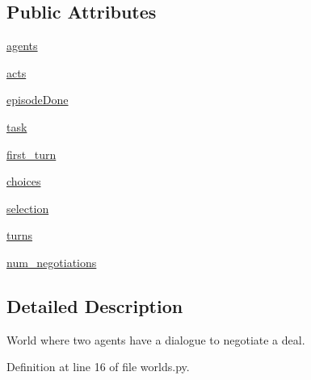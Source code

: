 \subsection*{Public Attributes}
\begin{DoxyCompactItemize}
\item 
\hyperlink{classparlai_1_1mturk_1_1tasks_1_1dealnodeal_1_1worlds_1_1MTurkDealNoDealDialogWorld_acc5597cd05b87753c3469fb199d606a2}{agents}
\item 
\hyperlink{classparlai_1_1mturk_1_1tasks_1_1dealnodeal_1_1worlds_1_1MTurkDealNoDealDialogWorld_a13200c06840e4af9142e7ae618d8aadb}{acts}
\item 
\hyperlink{classparlai_1_1mturk_1_1tasks_1_1dealnodeal_1_1worlds_1_1MTurkDealNoDealDialogWorld_ab9db614ebf4ef49ae3cb5c9d457dd94a}{episode\+Done}
\item 
\hyperlink{classparlai_1_1mturk_1_1tasks_1_1dealnodeal_1_1worlds_1_1MTurkDealNoDealDialogWorld_a56304056eb502fc650006f813463be53}{task}
\item 
\hyperlink{classparlai_1_1mturk_1_1tasks_1_1dealnodeal_1_1worlds_1_1MTurkDealNoDealDialogWorld_a2f5c4c36ef750abcc732aa69ecb40aed}{first\+\_\+turn}
\item 
\hyperlink{classparlai_1_1mturk_1_1tasks_1_1dealnodeal_1_1worlds_1_1MTurkDealNoDealDialogWorld_a8443d7268281402cc47e55bbb0e64852}{choices}
\item 
\hyperlink{classparlai_1_1mturk_1_1tasks_1_1dealnodeal_1_1worlds_1_1MTurkDealNoDealDialogWorld_aade83c7381db07e26f51d6a94479546d}{selection}
\item 
\hyperlink{classparlai_1_1mturk_1_1tasks_1_1dealnodeal_1_1worlds_1_1MTurkDealNoDealDialogWorld_aa0ef48dc444aa808a5aae96dfb750771}{turns}
\item 
\hyperlink{classparlai_1_1mturk_1_1tasks_1_1dealnodeal_1_1worlds_1_1MTurkDealNoDealDialogWorld_a89577b0e6dc72509d7ce67f899d48d75}{num\+\_\+negotiations}
\end{DoxyCompactItemize}


\subsection{Detailed Description}
\begin{DoxyVerb}World where two agents have a dialogue to negotiate a deal.
\end{DoxyVerb}
 

Definition at line 16 of file worlds.\+py.



